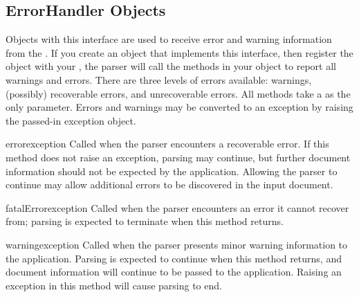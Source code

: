 \subsection{ErrorHandler Objects \label{sax-error-handler}}

Objects with this interface are used to receive error and warning
information from the .  If you create an object that
implements this interface, then register the object with your
, the parser will call the methods in your object to
report all warnings and errors. There are three levels of errors
available: warnings, (possibly) recoverable errors, and unrecoverable
errors.  All methods take a  as the only
parameter.  Errors and warnings may be converted to an exception by
raising the passed-in exception object.

\begin{methoddesc}[ErrorHandler]{error}{exception}
  Called when the parser encounters a recoverable error.  If this method
  does not raise an exception, parsing may continue, but further document
  information should not be expected by the application.  Allowing the
  parser to continue may allow additional errors to be discovered in the
  input document.
\end{methoddesc}

\begin{methoddesc}[ErrorHandler]{fatalError}{exception}
  Called when the parser encounters an error it cannot recover from;
  parsing is expected to terminate when this method returns.
\end{methoddesc}

\begin{methoddesc}[ErrorHandler]{warning}{exception}
  Called when the parser presents minor warning information to the
  application.  Parsing is expected to continue when this method returns,
  and document information will continue to be passed to the application.
  Raising an exception in this method will cause parsing to end.
\end{methoddesc}
